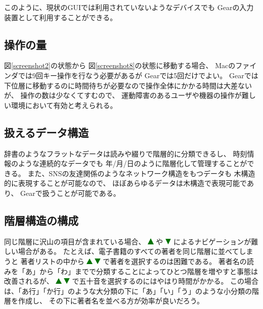 \documentclass[twoside]{wiss}
\def\GEAR{\textsf{Gear}}
\def\up{ \includegraphics[width=3mm,bb=0 0 36 36]{figures/uptriangle.pdf} }
\def\down{ \includegraphics[width=3mm,bb=0 0 36 36]{figures/downtriangle.pdf} }
\begin{document}
\noindent
このように、現状のGUIでは利用されていないようなデバイスでも
{\GEAR}の入力装置として利用することができる。

\subsection{操作の量}

図\ref{screenshot2}の状態から
図\ref{screenshot8}の状態に移動する場合、
Macのファインダでは9回キー操作を行なう必要があるが
{\GEAR}では5回だけでよい。
{\GEAR}では下位層に移動するのに時間待ちが必要なので操作全体にかかる時間は大差ないが、
操作の数は少なくてすむので、
運動障害のあるユーザや機器の操作が難しい環境において有効と考えられる。

\subsection{扱えるデータ構造}

辞書のようなフラットなデータは読みや綴りで階層的に分類できるし、
時刻情報のような連続的なデータでも
年/月/日のように階層化して管理することができる。
また、SNSの友達関係のようなネットワーク構造をもつデータも
木構造的に表現することが可能なので、
ほぼあらゆるデータは木構造で表現可能であり、
{\GEAR}で扱うことが可能である。

% 
% 
% 

\subsection{階層構造の構成}

同じ階層に沢山の項目が含まれている場合、
{\up}や{\down}によるナビゲーションが難しい場合がある。
たとえば、電子書籍のすべての著者を同じ階層に並べてしまうと
著者リストの中から{\up}{\down}で著者を選択するのは困難である。
著者名の読みを「あ」から「わ」までで分類することによってひとつ階層を増やすと事態は改善されるが、
{\up}{\down}で五十音を選択するのにはやはり時間がかかる。
この場合は、「あ行」「か行」のような大分類の下に「あ」「い」「う」のような小分類の階層を作成し、
その下に著者名を並べる方が効率が良いだろう。
\end{document}
